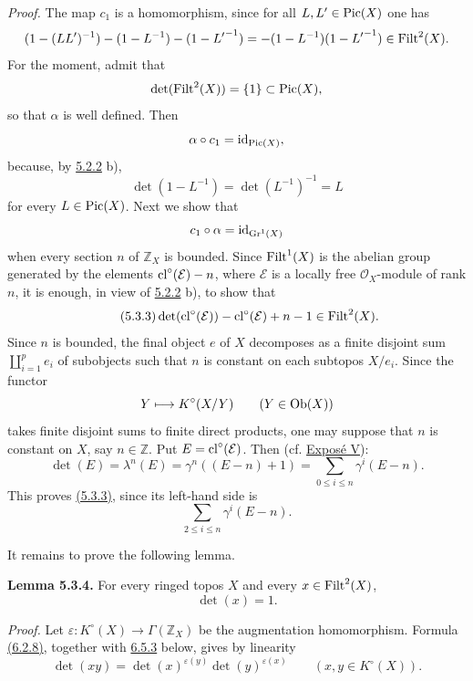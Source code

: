 \emph{Proof.}
The map $c_1$ is a homomorphism, since for all $L,L'\in\operatorname{Pic}(X)$ one has
\[
(1-(LL')^{-1})-(1-L^{-1})-(1-{L'}^{-1})
=-(1-L^{-1})(1-{L'}^{-1})\in\operatorname{Filt}^2(X).
\]
For the moment, admit that
\[
\det(\operatorname{Filt}^2(X))=\{1\}\subset\operatorname{Pic}(X),
\]
so that $\alpha$ is well defined. Then
\[
\alpha\circ c_1=\operatorname{id}_{\operatorname{Pic}(X)},
\]
because, by \hyperlink{sga6.e10.rem.5-2-2}{5.2.2} b),
\[
\det(1-L^{-1})=\det(L^{-1})^{-1}=L
\]
for every $L\in\operatorname{Pic}(X)$. Next we show that
\[
c_1\circ\alpha=\operatorname{id}_{\operatorname{Gr}^1(X)}
\]
when every section $n$ of $\mathbb Z_X$ is bounded. Since $\operatorname{Filt}^1(X)$ is
the abelian group generated by the elements $\operatorname{cl}^\circ(\mathcal E)-n$, where
$\mathcal E$ is a locally free $\mathcal O_X$-module of rank $n$, it is
enough, in view of \hyperlink{sga6.e10.rem.5-2-2}{5.2.2} b), to show that
\begin{equation}\tag{5.3.3}
\det(\operatorname{cl}^\circ(\mathcal E))-\operatorname{cl}^\circ(\mathcal E)+n-1\in\operatorname{Filt}^2(X).
\end{equation}
Since $n$ is bounded, the final object $e$ of $X$ decomposes as a finite
disjoint sum $\coprod_{i=1}^p e_i$ of subobjects such that $n$ is constant on
each subtopos $X/e_i$. Since the functor
\[
Y\longmapsto K^\circ(X/Y)\qquad(Y\in\operatorname{Ob}(X))
\]
takes finite disjoint sums to finite direct products, one may suppose that
$n$ is constant on $X$, say $n\in\mathbb Z$. Put
$E=\operatorname{cl}^\circ(\mathcal E)$. Then (cf. \hyperlink{sga6.e05.expose}{Expos\'e V}):
\[
\det(E)=\lambda^n(E)=\gamma^n((E-n)+1)
=\sum_{0\leq i\leq n}\gamma^i(E-n).
\]
This proves \hyperlink{sga6.e10.eq.5-3-3}{(5.3.3)}, since its left-hand side is
\[
\sum_{2\leq i\leq n}\gamma^i(E-n).
\]

It remains to prove the following lemma.

\textbf{Lemma 5.3.4.}
For every ringed topos $X$ and every $x\in\operatorname{Filt}^2(X)$,
\[
\det(x)=1.
\]

\emph{Proof.}
Let $\varepsilon:K^\circ(X)\to\Gamma(\mathbb Z_X)$ be the augmentation
homomorphism. Formula \hyperlink{sga6.e10.eq.6-2-8}{(6.2.8)}, together with \hyperlink{sga6.e10.para.6-5-3}{6.5.3} below, gives by linearity
\begin{equation}\tag{5.3.5}
\det(xy)=\det(x)^{\varepsilon(y)}\det(y)^{\varepsilon(x)}
\qquad(x,y\in K^\circ(X)).
\end{equation}


